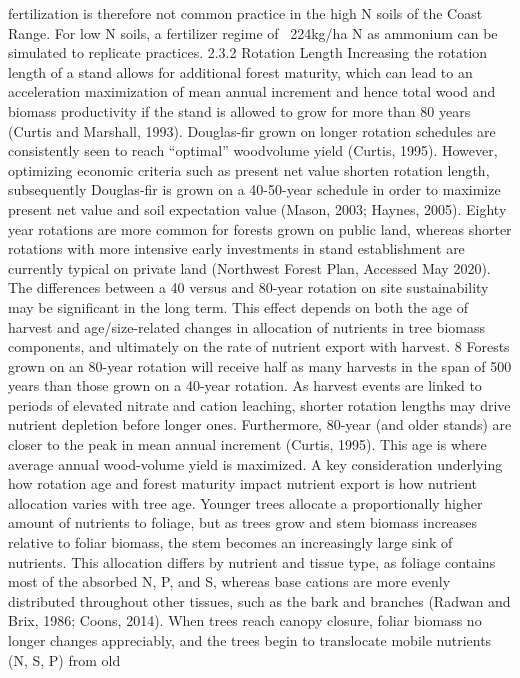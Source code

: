 \documentclass{article}
\begin{document}
fertilization is therefore not common practice in the high N soils of the Coast Range. For low N
soils, a fertilizer regime of ~224kg/ha N as ammonium can be simulated to replicate practices.
2.3.2 Rotation Length
Increasing the rotation length of a stand allows for additional forest maturity, which can lead to
an acceleration maximization of mean annual increment and hence total wood and biomass
productivity if the stand is allowed to grow for more than 80 years (Curtis and Marshall, 1993).
Douglas-fir grown on longer rotation schedules are consistently seen to reach “optimal” woodvolume yield (Curtis, 1995). However, optimizing economic criteria such as present net value
shorten rotation length, subsequently Douglas-fir is grown on a 40-50-year schedule in order to
maximize present net value and soil expectation value (Mason, 2003; Haynes, 2005). Eighty
year rotations are more common for forests grown on public land, whereas shorter rotations with
more intensive early investments in stand establishment are currently typical on private land
(Northwest Forest Plan, Accessed May 2020). The differences between a 40 versus and 80-year
rotation on site sustainability may be significant in the long term. This effect depends on both the
age of harvest and age/size-related changes in allocation of nutrients in tree biomass components,
and ultimately on the rate of nutrient export with harvest. 
8
Forests grown on an 80-year rotation will receive half as many harvests in the span of 500 years
than those grown on a 40-year rotation. As harvest events are linked to periods of elevated nitrate
and cation leaching, shorter rotation lengths may drive nutrient depletion before longer ones.
Furthermore, 80-year (and older stands) are closer to the peak in mean annual increment (Curtis,
1995). This age is where average annual wood-volume yield is maximized.
A key consideration underlying how rotation age and forest maturity impact nutrient export is
how nutrient allocation varies with tree age. Younger trees allocate a proportionally higher
amount of nutrients to foliage, but as trees grow and stem biomass increases relative to foliar
biomass, the stem becomes an increasingly large sink of nutrients. This allocation differs by
nutrient and tissue type, as foliage contains most of the absorbed N, P, and S, whereas base
cations are more evenly distributed throughout other tissues, such as the bark and branches
(Radwan and Brix, 1986; Coons, 2014). When trees reach canopy closure, foliar biomass no
longer changes appreciably, and the trees begin to translocate mobile nutrients (N, S, P) from old
\end{document}
